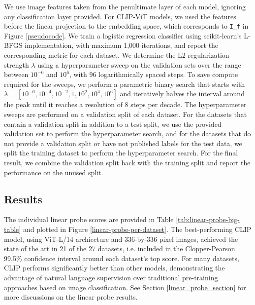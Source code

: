 \documentclass{article}
\begin{document}
We use image features taken from the penultimate layer of each model, ignoring any classification layer provided.
For CLIP-ViT models, we used the features before the linear projection to the embedding space, which corresponds to \texttt{I\_f} in Figure \ref{pseudocode}.
We train a logistic regression classifier using scikit-learn's L-BFGS implementation, with maximum 1,000 iterations, and report the corresponding metric for each dataset. We determine the L2 regularization strength $\lambda$ using a hyperparameter sweep on the validation sets over the range between $10^{-6}$ and $10^6$, with 96 logarithmically spaced steps. To save compute required for the sweeps, we perform a parametric binary search that starts with $\lambda=[10^{-6}, 10^{-4}, 10^{-2}, 1, 10^2, 10^4, 10^6]$ and iteratively halves the interval around the peak until it reaches a resolution of 8 steps per decade. The hyperparameter sweeps are performed on a validation split of each dataset. For the datasets that contain a validation split in addition to a test split, we use the provided validation set to perform the hyperparameter search, and for the datasets that do not provide a validation split or have not published labels for the test data, we split the training dataset to perform the hyperparameter search. For the final result, we combine the validation split back with the training split and report the performance on the unused split.

\subsection{Results}

The individual linear probe scores are provided in Table \ref{tab:linear-probe-big-table} and plotted in Figure \ref{linear-probe-per-dataset}. The best-performing CLIP model, using ViT-L/14 archiecture and 336-by-336 pixel images, achieved the state of the art in 21 of the 27 datasets, i.e. included in the Clopper-Pearson 99.5\% confidence interval around each dataset's top score.
For many datasets, CLIP performs significantly better than other models, demonstrating the advantage of natural language supervision over traditional pre-training approaches based on image classification.
See Section \ref{linear_probe_section} for more discussions on the linear probe results.


\end{document}
